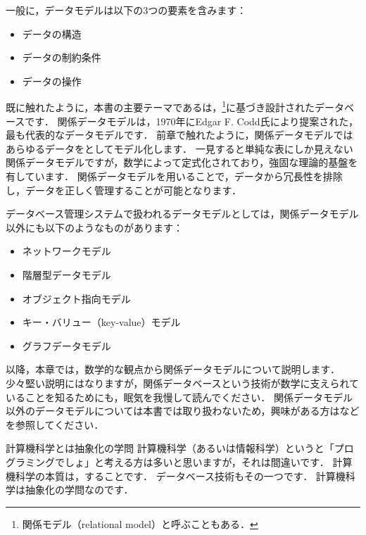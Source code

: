 一般に，データモデルは以下の3つの要素を含みます：
\begin{itemize}
\item データの構造
\item データの制約条件
\item データの操作
\end{itemize}

既に触れたように，本書の主要テーマであるは，\footnote{関係モデル（relational model）と呼ぶこともある．}に基づき設計されたデータベースです．
関係データモデルは，1970年にEdgar F. Codd氏により提案された，最も代表的なデータモデルです\cite{Codd1970}．
前章で触れたように，関係データモデルではあらゆるデータをとしてモデル化します．
一見すると単純な表にしか見えない関係データモデルですが，数学によって定式化されており，強固な理論的基盤を有しています．
関係データモデルを用いることで，データから冗長性を排除し，データを正しく管理することが可能となります．

データベース管理システムで扱われるデータモデルとしては，関係データモデル以外にも以下のようなものがあります：
\begin{itemize}
\item ネットワークモデル\cite{Bachman1969}
\item 階層型データモデル\cite{Tsichritzis1976}
\item オブジェクト指向モデル\cite{Atkinson1994}
\item キー・バリュー（key-value）モデル\cite{DeCandia2007}
\item グラフデータモデル\cite{Angles2008}
\end{itemize}
以降，本章では，数学的な観点から関係データモデルについて説明します．
少々堅い説明にはなりますが，関係データベースという技術が数学に支えられていることを知るためにも，眠気を我慢して読んでください．
関係データモデル以外のデータモデルについては本書では取り扱わないため，興味がある方は\cite{北川本}などを参照してください．

\begin{notebox}{計算機科学とは抽象化の学問}
計算機科学（あるいは情報科学）というと「プログラミングでしょ」と考える方は多いと思いますが，それは間違いです．
計算機科学の本質は，することです．
データベース技術もその一つです．
計算機科学は抽象化の学問なのです．
\end{notebox}


